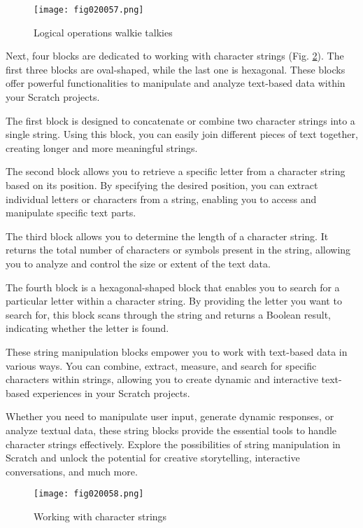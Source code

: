 \begin{figure}[H]
   \centering
   \texttt{[image: fig020057.png]}
   \caption{Logical operations walkie talkies}
\label{fig020057}
\end{figure}

Next, four blocks are dedicated to working with character strings (Fig. \ref{fig020058}). The first three blocks are oval-shaped, while the last one is hexagonal. These blocks offer powerful functionalities to manipulate and analyze text-based data within your Scratch projects.

The first block is designed to concatenate or combine two character strings into a single string. Using this block, you can easily join different pieces of text together, creating longer and more meaningful strings.

The second block allows you to retrieve a specific letter from a character string based on its position. By specifying the desired position, you can extract individual letters or characters from a string, enabling you to access and manipulate specific text parts.

The third block allows you to determine the length of a character string. It returns the total number of characters or symbols present in the string, allowing you to analyze and control the size or extent of the text data.

The fourth block is a hexagonal-shaped block that enables you to search for a particular letter within a character string. By providing the letter you want to search for, this block scans through the string and returns a Boolean result, indicating whether the letter is found.

These string manipulation blocks empower you to work with text-based data in various ways. You can combine, extract, measure, and search for specific characters within strings, allowing you to create dynamic and interactive text-based experiences in your Scratch projects.

Whether you need to manipulate user input, generate dynamic responses, or analyze textual data, these string blocks provide the essential tools to handle character strings effectively. Explore the possibilities of string manipulation in Scratch and unlock the potential for creative storytelling, interactive conversations, and much more.

\begin{figure}[H]
   \centering
   \texttt{[image: fig020058.png]}
   \caption{Working with character strings}
\label{fig020058}
\end{figure}

